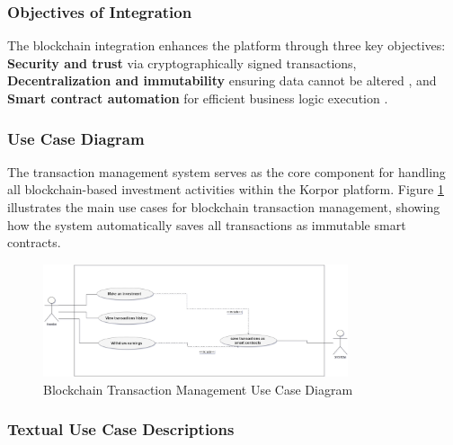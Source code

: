 \subsubsection{Objectives of Integration}

The blockchain integration enhances the platform through three key objectives: \textbf{Security and trust} via cryptographically signed transactions, \textbf{Decentralization and immutability} ensuring data cannot be altered \cite{Antonopoulos2018MasteringEthereum}, and \textbf{Smart contract automation} for efficient business logic execution \cite{Bartoletti2017EmpiricalAnalysis, ZhangBlockchainPropertyRights2023}.

\subsubsection{Use Case Diagram}

The transaction management  system serves as the core component for handling all blockchain-based investment activities within the Korpor platform. Figure \ref{fig:transaction-use-case} illustrates the main use cases for blockchain transaction management, showing how the system automatically saves all transactions as immutable smart contracts.

\begin{figure}[htbp]
    \centering
    \includegraphics[width=0.8\textwidth]{images/transaction_use_case_diagram.png}
    \caption{Blockchain Transaction Management Use Case Diagram}
    \label{fig:transaction-use-case}
\end{figure}
\subsubsection{Textual Use Case Descriptions}

